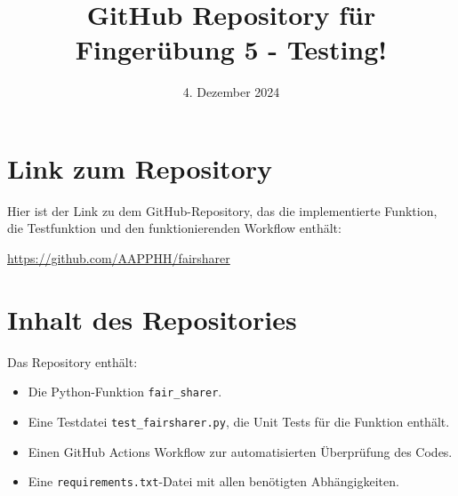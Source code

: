 \documentclass[a4paper,12pt]{article}
\title{GitHub Repository für Fingerübung 5 - Testing!}
\date{4. Dezember 2024}
\begin{document}
\maketitle

\section*{Link zum Repository}

Hier ist der Link zu dem GitHub-Repository, das die implementierte Funktion, die Testfunktion und den funktionierenden Workflow enthält:

\noindent
\href{https://github.com/AAPPHH/fairsharer}{https://github.com/AAPPHH/fairsharer}

\section*{Inhalt des Repositories}

Das Repository enthält:
\begin{itemize}
    \item Die Python-Funktion \texttt{fair\_sharer}.
    \item Eine Testdatei \texttt{test\_fairsharer.py}, die Unit Tests für die Funktion enthält.
    \item Einen GitHub Actions Workflow zur automatisierten Überprüfung des Codes.
    \item Eine \texttt{requirements.txt}-Datei mit allen benötigten Abhängigkeiten.
\end{itemize}
\end{document}
